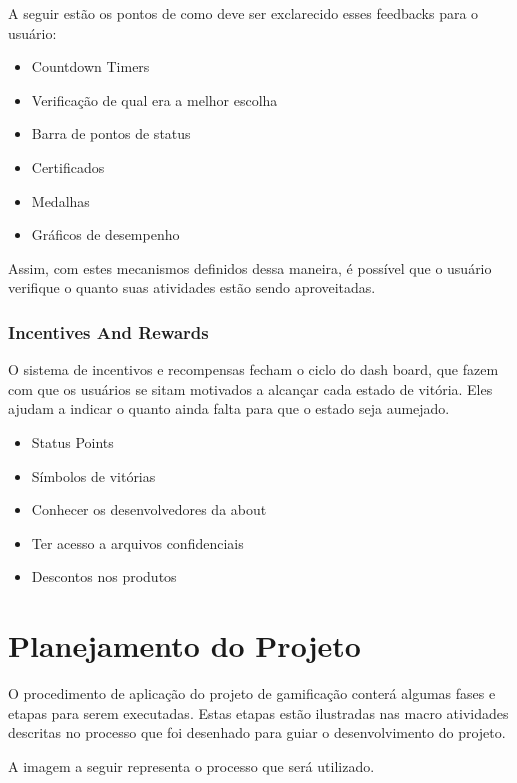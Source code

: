 A seguir estão os pontos  de como deve ser exclarecido esses feedbacks para o 
usuário:

\begin{itemize}
    \item Countdown Timers
    \item Verificação de qual era a melhor escolha
    \item Barra de pontos de status
    \item Certificados
    \item Medalhas
    \item Gráficos de desempenho
\end{itemize}

Assim, com estes mecanismos definidos dessa maneira, é possível que o usuário verifique 
o quanto suas atividades estão sendo aproveitadas.

\subsubsection{Incentives And Rewards}
\label{sub:incentives_and_rewards}
O sistema de incentivos e recompensas fecham o ciclo do dash board, que fazem com que 
os usuários se sitam motivados a alcançar cada estado de vitória. Eles ajudam a indicar
o quanto ainda falta para que o estado seja aumejado.

\begin{itemize}
    \item Status Points
    \item Símbolos de vitórias
    \item Conhecer os desenvolvedores da about
    \item Ter acesso a arquivos confidenciais
    \item Descontos nos produtos
\end{itemize}

\section{Planejamento do Projeto}
\label{sub:planejamento_do_projeto}
O procedimento de aplicação do projeto de gamificação conterá algumas fases
e etapas para serem executadas. Estas etapas estão ilustradas nas macro
atividades descritas no processo que foi desenhado para guiar o desenvolvimento
do projeto.

A imagem a seguir representa o processo que será utilizado.

